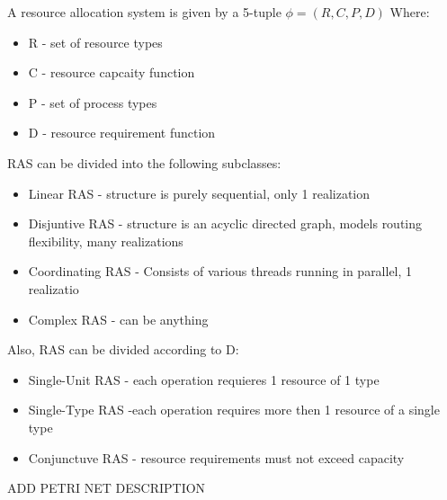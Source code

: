 {
A resource allocation system is given by a 5-tuple $\phi =(R,C,P,D)$
Where:
 \begin{itemize}
        \item R - set of resource types
        \item C - resource capcaity function
        \item P - set of process types
        \item D - resource requirement function
\end{itemize}

RAS can be divided into the following subclasses:
\begin{itemize}
        \item Linear RAS - structure is purely sequential, only 1 realization
        \item Disjuntive RAS - structure is an acyclic directed graph, models routing flexibility, many realizations
        \item Coordinating RAS - Consists of various threads running in parallel, 1 realizatio
        \item Complex RAS - can be anything
\end{itemize}

Also, RAS can be divided according to D:
\begin{itemize}
        \item Single-Unit RAS - each operation requieres 1 resource of 1 type
        \item Single-Type RAS -each operation requires more then 1 resource of a single type
        \item Conjunctuve RAS - resource requirements must not exceed capacity
        
\end{itemize}
ADD PETRI NET DESCRIPTION

}


